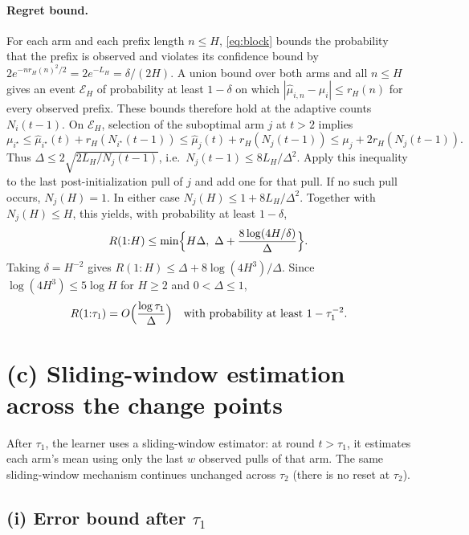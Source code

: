 \paragraph{Regret bound.} For each arm and each prefix length $n\le H$, \eqref{eq:block} bounds the probability that the prefix is observed and violates its confidence bound by $2e^{-nr_H(n)^2/2}=2e^{-L_H}=\delta/(2H)$. A union bound over both arms and all $n\le H$ gives an event $\mathcal E_H$ of probability at least $1-\delta$ on which $|\widehat\mu_{i,n}-\mu_i|\le r_H(n)$ for every observed prefix. These bounds therefore hold at the adaptive counts $N_i(t-1)$. On $\mathcal E_H$, selection of the suboptimal arm $j$ at $t>2$ implies
\[
\mu_{i^\star}\le\widehat\mu_{i^\star}(t)+r_H(N_{i^\star}(t-1))\le\widehat\mu_j(t)+r_H(N_j(t-1))\le\mu_j+2r_H(N_j(t-1)).
\]
Thus $\Delta\le2\sqrt{2L_H/N_j(t-1)}$, i.e.\ $N_j(t-1)\le 8L_H/\Delta^2$. Apply this inequality to the last post-initialization pull of $j$ and add one for that pull. If no such pull occurs, $N_j(H)=1$. In either case $N_j(H)\le1+8L_H/\Delta^2$. Together with $N_j(H)\le H$, this yields, with probability at least $1-\delta$,
\begin{equation}\label{eq:ucb_bound}
R(1{:}H)\le\min\Bigl\{H\Delta,\ \Delta+\frac{8\log(4H/\delta)}{\Delta}\Bigr\}.
\end{equation}
Taking $\delta=H^{-2}$ gives $R(1{:}H)\le\Delta+8\log(4H^3)/\Delta$. Since $\log(4H^3)\le5\log H$ for $H\ge2$ and $0<\Delta\le1$,
\[
R(1{:}\tau_1)=O\Bigl(\frac{\log\tau_1}{\Delta}\Bigr)\quad\text{with probability at least }1-\tau_1^{-2}.
\]

\section{(c) Sliding-window estimation across the change points}\label{sec:window}

After $\tau_1$, the learner uses a sliding-window estimator: at round $t>\tau_1$, it estimates each arm's mean using only the last $w$ observed pulls of that arm. The same sliding-window mechanism continues unchanged across $\tau_2$ (there is no reset at $\tau_2$).

\subsection*{(i) Error bound after $\tau_1$}

